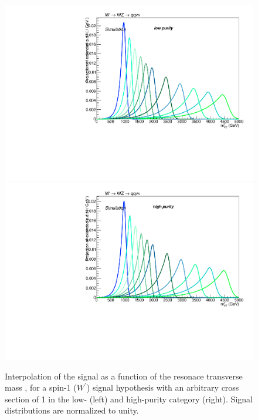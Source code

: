 \begin{figure}[!htb]
  \centering
    \includegraphics[width=.495\textwidth]{plotsAlpha_tesi/XVZnnlp/XWZInv_Signal.pdf}
    \includegraphics[width=.495\textwidth]{plotsAlpha_tesi/XVZnnhp/XWZInv_Signal.pdf}
  \caption{Interpolation of the signal as a function of the resonace transverse mass \mtVZ, for a spin-1 ($W^{'}$) signal hypothesis with an arbitrary cross section of 1 \pb in the low- (left) and high-purity category (right). Signal distributions are normalized to unity.}
  \label{fig:XWZInv_Signal}
\end{figure}



